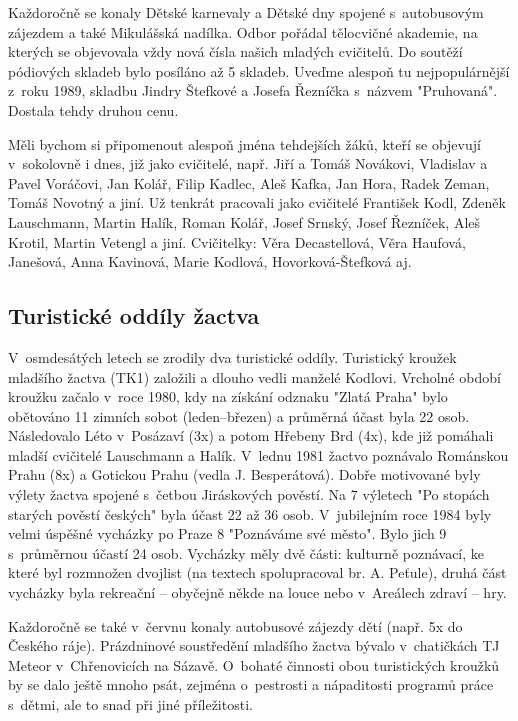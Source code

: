 \documentclass[a5paper, 12pt, twoside]{article}
\begin{document}
Každoročně se konaly Dětské karnevaly a Dětské dny spojené s~autobusovým
zájezdem a také Mikulášská nadílka. Odbor pořádal tělocvičné akademie,
na kterých se objevovala vždy nová čísla našich mladých cvičitelů. Do
soutěží pódiových skladeb bylo posíláno až 5 skladeb. Uveďme alespoň tu
nejpopulárnější z~roku 1989, skladbu Jindry Štefkové a Josefa Řezníčka
s~názvem "Pruhovaná". Dostala tehdy druhou cenu.

Měli bychom si připomenout alespoň jména tehdejších žáků, kteří se
objevují v~sokolovně i dnes, již jako cvičitelé, např. Jiří a Tomáš
Novákovi, Vladislav a Pavel Voráčovi, Jan Kolář, Filip Kadlec, Aleš
Kafka, Jan Hora, Radek Zeman, Tomáš Novotný a jiní. Už tenkrát pracovali
jako cvičitelé František Kodl, Zdeněk Lauschmann, Martin Halík, Roman
Kolář, Josef Srnský, Josef Řezníček, Aleš Krotil, Martin Vetengl a jiní.
Cvičitelky: Věra Decastellová, Věra Haufová, Janešová, Anna Kavinová,
Marie Kodlová, Hovorková-Štefková aj.

\subsection{Turistické oddíly
žactva}

V~osmdesátých letech se zrodily dva turistické oddíly. Turistický
kroužek mladšího žactva (TK1) založili a dlouho vedli manželé Kodlovi.
Vrcholné období kroužku začalo v~roce 1980, kdy na získání odznaku
"Zlatá Praha" bylo obětováno 11 zimních sobot (leden--březen) a
průměrná účast byla 22 osob. Následovalo Léto v~Posázaví (3x) a potom
Hřebeny Brd (4x), kde již pomáhali mladší cvičitelé Lauschmann a Halík.
V~lednu 1981 žactvo poznávalo Románskou Prahu (8x) a Gotickou Prahu
(vedla J. Besperátová). Dobře motivované byly výlety žactva spojené
s~četbou Jiráskových pověstí. Na 7 výletech "Po stopách starých pověstí
českých" byla účast 22 až 36 osob. V~jubilejním roce 1984 byly velmi
úspěšné vycházky po Praze 8 "Poznáváme své město". Bylo jich 9
s~průměrnou účastí 24 osob. Vycházky měly dvě části: kulturně poznávací,
ke které byl rozmnožen dvojlist (na textech spolupracoval br. A.
Peťule), druhá část vycházky byla rekreační -- obyčejně někde na louce
nebo v~Areálech zdraví -- hry.

Každoročně se také v~červnu konaly autobusové zájezdy dětí (např. 5x do
Českého ráje). Prázdninové soustředění mladšího žactva bývalo
v~chatičkách TJ Meteor v~Chřenovicích na Sázavě. O~bohaté činnosti obou
turistických kroužků by se dalo ještě mnoho psát, zejména o~pestrosti a
nápaditosti programů práce s~dětmi, ale to snad při jiné příležitosti.
\end{document}
